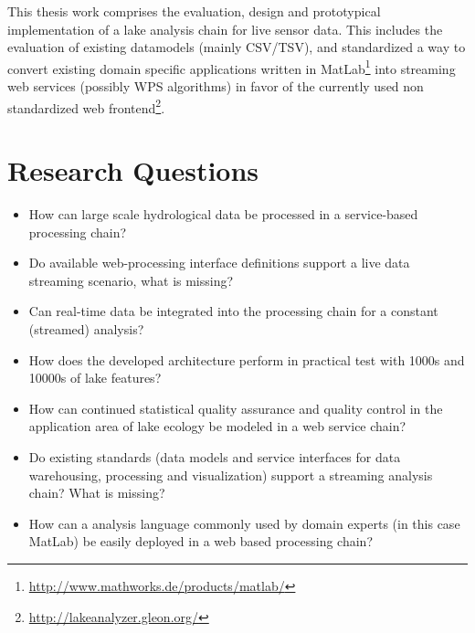 \documentclass[paper=a4,fontsize=11pt]{scrartcl}
\newcommand{\fu}[1]{\footnote{\url{#1}}}
\begin{document}
    This thesis work comprises the evaluation, design and prototypical implementation of a lake analysis chain for live sensor data.
    This includes the evaluation of existing datamodels (mainly CSV/TSV), and standardized a way to convert existing domain specific applications written in MatLab\fu{http://www.mathworks.de/products/matlab/} into streaming web services (possibly WPS algorithms) in favor of the currently used non standardized web frontend\fu{http://lakeanalyzer.gleon.org/}.

    \section*{Research Questions}
    \begin{itemize}
        \item How can large scale hydrological data be processed in a service-based processing chain?
        \item Do available web-processing interface definitions support a live data streaming scenario, what is missing?
        \item Can real-time data be integrated into the processing chain for a constant (streamed) analysis?
        \item How does the developed architecture perform in practical test with 1000s and 10000s of lake features?
        \item How can continued statistical quality assurance and quality control in the application area of lake ecology be modeled in a web service chain?
        \item Do existing standards (data models and service interfaces for data warehousing, processing and visualization) support a streaming analysis chain? What is missing?
        \item How can a analysis language commonly used by domain experts (in this case MatLab) be easily deployed in a web based processing chain?
    \end{itemize}
\end{document}
